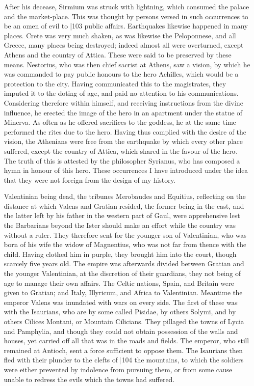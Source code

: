 After his decease, Sirmium was struck with lightning, which consumed the palace and the market-place. This was thought by persons versed in such occurrences to be an omen of evil to
|103
public affairs. Earthquakes likewise happened in many places. Crete was very much shaken, as was likewise the Peloponnese, and all Greece, many places being destroyed; indeed almost all were overturned, except Athens and the country of Attica. These were said to be preserved by these means. Nestorius, who was then chief sacrist at Athens, saw a vision, by which he was commanded to pay public honours to the hero Achilles, which would be a protection to the city. Having communicated this to the magistrates, they imputed it to the doting of age, and paid no attention to his communications. Considering therefore within himself, and receiving instructions from the divine influence, he erected the image of the hero in an apartment under the statue of Minerva. As often as he offered sacrifices to the goddess, he at the same time performed the rites due to the hero. Having thus complied with the desire of the vision, the Athenians were free from the earthquake by which every other place suffered, except the country of Attica, which shared in the favour of the hero. The truth of this is attested by the philosopher Syrianus, who has composed a hymn in honour of this hero. These occurrences I have introduced under the idea that they were not foreign from the design of my history.

Valentinian being dead, the tribunes Merobaudes and Equitius, reflecting on the distance at which Valens and Gratian resided, the former being in the east, and the latter left by his father in the western part of Gaul, were apprehensive lest the Barbarians beyond the Ister should make an effort while the country was without a ruler. They therefore sent for the younger son of Valentinian, who was born of his wife the widow of Magnentius, who was not far from thence with the child. Having clothed him in purple, they brought him into the court, though scarcely five years old. The empire was afterwards divided between Gratian and the younger Valentinian, at the discretion of their guardians, they not being of age to manage their own affairs. The Celtic nations, Spain, and Britain were given to Gratian; and Italy, Illyricum, and Africa to Valentinian. Meantime the emperor Valens was inundated with wars on every side. The first of these was with the Isaurians, who are by some called Pisidae, by others Solymi, and by others Cilices Montani, or Mountain Cilicians. They pillaged the towns of Lycia and Pamphylia, and though they could not obtain possession of the walls and houses, yet carried off all that was in the roads and fields. The emperor, who still remained at Antioch, sent a force sufficient to oppose them. The Isaurians then fled with their plunder to the clefts of
|104
the mountains, to which the soldiers were either prevented by indolence from pursuing them, or from some cause unable to redress the evils which the towns had suffered.

